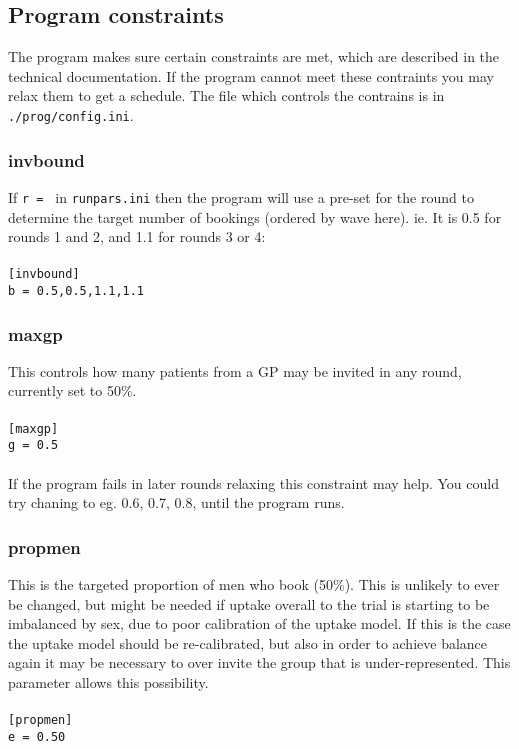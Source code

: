 \documentclass[a4paper]{article}
\begin{document}
\subsection{Program constraints}

The program makes sure certain constraints are met, which are described in the technical documentation. If the program cannot meet these contraints you may relax them to get a schedule. The file which controls the contrains is in \texttt{./prog/config.ini}.

\subsubsection{invbound}

If \texttt{r = } in \texttt{runpars.ini} then the program will use a pre-set for the round to determine the target number of bookings (ordered by wave here). ie. It is 0.5 for rounds 1 and 2, and 1.1 for rounds 3 or 4:\\
\\ \texttt{[invbound]\\
b = 0.5,0.5,1.1,1.1\\} 


\subsubsection{maxgp}

This controls how many patients from a GP may be invited in any round, currently set to 50\%. \\
\\ \texttt{[maxgp]\\
g = 0.5}\\
\\ If the program fails in later rounds relaxing this constraint may help. You could try chaning to eg. 0.6, 0.7, 0.8, until the program runs.

\subsubsection{propmen}

This is the targeted proportion of men who book (50\%). This is unlikely to ever be changed, but might be needed if uptake overall to the trial is starting to be imbalanced by sex, due to poor calibration of the uptake model. If this is the case the uptake model should be re-calibrated, but also in order to achieve balance again it may be necessary to over invite the group that is under-represented. This parameter allows this possibility.
\\
\\ \texttt{[propmen]\\
e = 0.50}
\end{document}
